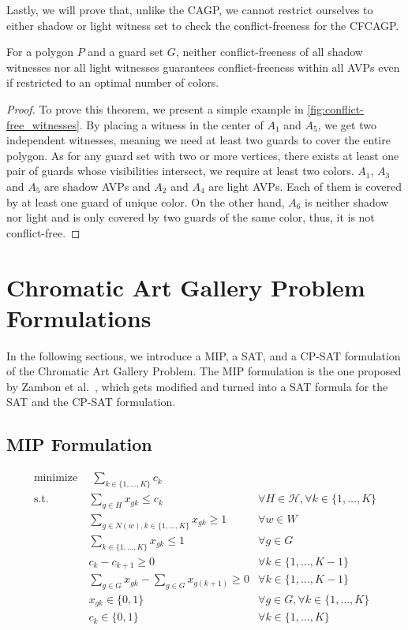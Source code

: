 Lastly, we will prove that, unlike the CAGP, we cannot restrict ourselves to either shadow or light witness set to check the conflict-freeness for the CFCAGP.

\begin{theorem}\label{thm:conflict-free_witnesses}
For a polygon $P$ and a guard set $G$, neither conflict-freeness of all shadow witnesses nor all light witnesses guarantees conflict-freeness within all AVPs even if restricted to an optimal number of colors.
\end{theorem}
\begin{proof}
To prove this theorem, we present a simple example in \cref{fig:conflict-free_witnesses}. By placing a witness in the center of $A_{1}$ and $A_{5}$, we get two independent witnesses, meaning we need at least two guards to cover the entire polygon. As for any guard set with two or more vertices, there exists at least one pair of guards whose visibilities intersect, we require at least two colors. $A_{1}$, $A_{3}$ and $A_{5}$ are shadow AVPs and $A_{2}$ and $A_{4}$ are light AVPs. Each of them is covered by at least one guard of unique color. On the other hand, $A_{6}$ is neither shadow nor light and is only covered by two guards of the same color, thus, it is not conflict-free.
\end{proof}

\chapter{Chromatic Art Gallery Problem Formulations}

In the following sections, we introduce a MIP, a SAT, and a CP-SAT formulation of the Chromatic Art Gallery Problem. The MIP formulation is the one proposed by Zambon et al.~\cite{zambon2014exact}, which gets modified and turned into a SAT formula for the SAT and the CP-SAT formulation.

\section{MIP Formulation}

\begin{align}
\label{eq_MIP:f.0} \mbox{minimize}~& \;\sum_{k\in \{1,\ldots,K\}} c_{k}& \\
\label{eq_MIP:f.1} \mbox{s.t. } &\sum_{g \in H}x_{gk} \leq c_{k} & \forall H \in \mathcal{H}, \forall k\in \{1,\ldots,K\}\\
\label{eq_MIP:f.2}&\sum_{g\in N(w), k\in \{1,\ldots,K\}}x_{gk}\geq 1 & \forall w\in W\\
\label{eq_MIP:f.3}&\sum_{k\in \{1,\ldots,K\}}x_{gk}\leq1 & \forall g\in G\\
\label{eq_MIP:f.4}&c_{k} - c_{k+1} \geq 0 & \forall k\in \{1,\ldots,K-1\}\\
\label{eq_MIP:f.5}&\sum_{g\in G}x_{gk} - \sum_{g\in G}x_{g(k+1)} \geq 0 & \forall k\in \{1,\ldots,K-1\}\\
\label{eq_MIP:f.6}& x_{gk} \in \{0,1\} & \forall g\in G, \forall k\in \{1,\ldots,K\}\\
\label{eq_MIP:f.7}& c_{k}\in \{0,1\} & \forall k\in \{1,\ldots,K\}
\end{align}


